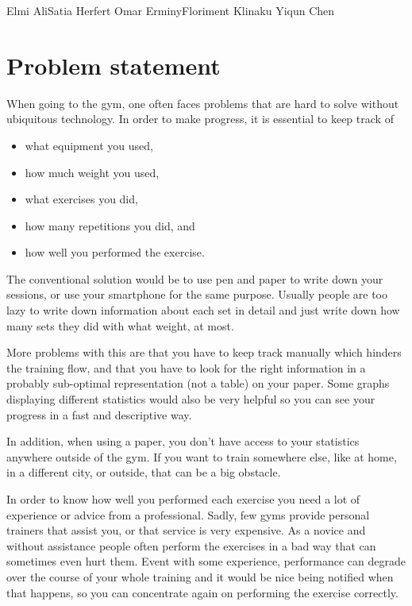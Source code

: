 \documentclass{tk3-team}
\begin{document}
%
                {Elmi Ali}{Satia Herfert}%
                {Omar Erminy}{Floriment Klinaku}%
                {Yiqun Chen}%

\section{Problem statement}

When going to the gym, one often faces problems that are hard to solve without ubiquitous technology. In order to make progress, it is essential to keep track of
\begin{itemize}
	\item what equipment you used,
	\item how much weight you used,
	\item what exercises you did,
	\item how many repetitions you did, and
	\item how well you performed the exercise.
\end{itemize}

The conventional solution would be to use pen and paper to write down your sessions, or use your smartphone for the same purpose. Usually people are too lazy to write down information about each set in detail and just write down how many sets they did with what weight, at most.

More problems with this are that you have to keep track manually which hinders the training flow, and that you have to look for the right information in a probably sub-optimal representation (not a table) on your paper. Some graphs displaying different statistics would also be very helpful so you can see your progress in a fast and descriptive way.

In addition, when using a paper, you don't have access to your statistics anywhere outside of the gym. If you want to train somewhere else, like at home, in a different city, or outside, that can be a big obstacle.

In order to know how well you performed each exercise you need a lot of experience or advice from a professional. Sadly, few gyms provide personal trainers that assist you, or that service is very expensive. As a novice and without assistance people often perform the exercises in a bad way that can sometimes even hurt them. Event with some experience, performance can degrade over the course of your whole training and it would be nice being notified when that happens, so you can concentrate again on performing the exercise correctly.
\end{document}
